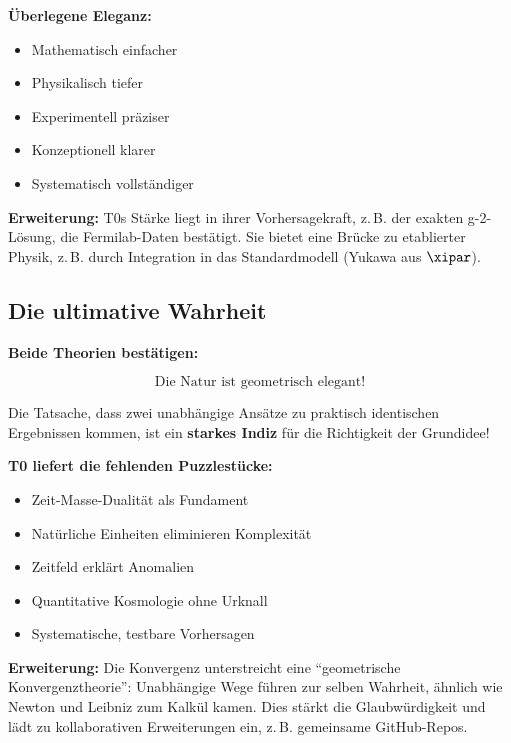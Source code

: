 	\textbf{Überlegene Eleganz:}
	\begin{itemize}
		\item Mathematisch einfacher
		\item Physikalisch tiefer
		\item Experimentell präziser
		\item Konzeptionell klarer
		\item Systematisch vollständiger
	\end{itemize}
	
	\textbf{Erweiterung:} T0s Stärke liegt in ihrer Vorhersagekraft, z.\,B. der exakten g-2-Lösung, die Fermilab-Daten bestätigt. Sie bietet eine Brücke zu etablierter Physik, z.\,B. durch Integration in das Standardmodell (Yukawa aus $\xipar$).
	
	\subsection{Die ultimative Wahrheit}
	
	\begin{gemeinsam}
		\textbf{Beide Theorien bestätigen:}
		
		\begin{equation}
			\boxed{\text{Die Natur ist geometrisch elegant!}}
		\end{equation}
		
		Die Tatsache, dass zwei unabhängige Ansätze zu praktisch identischen Ergebnissen kommen, ist ein \textbf{starkes Indiz} für die Richtigkeit der Grundidee!
		
		\textbf{T0 liefert die fehlenden Puzzlestücke:}
		\begin{itemize}
			\item Zeit-Masse-Dualität als Fundament
			\item Natürliche Einheiten eliminieren Komplexität
			\item Zeitfeld erklärt Anomalien
			\item Quantitative Kosmologie ohne Urknall
			\item Systematische, testbare Vorhersagen
		\end{itemize}
		
		\textbf{Erweiterung:} Die Konvergenz unterstreicht eine ``geometrische Konvergenztheorie'': Unabhängige Wege führen zur selben Wahrheit, ähnlich wie Newton und Leibniz zum Kalkül kamen. Dies stärkt die Glaubwürdigkeit und lädt zu kollaborativen Erweiterungen ein, z.\,B. gemeinsame GitHub-Repos.
	\end{gemeinsam}
	
